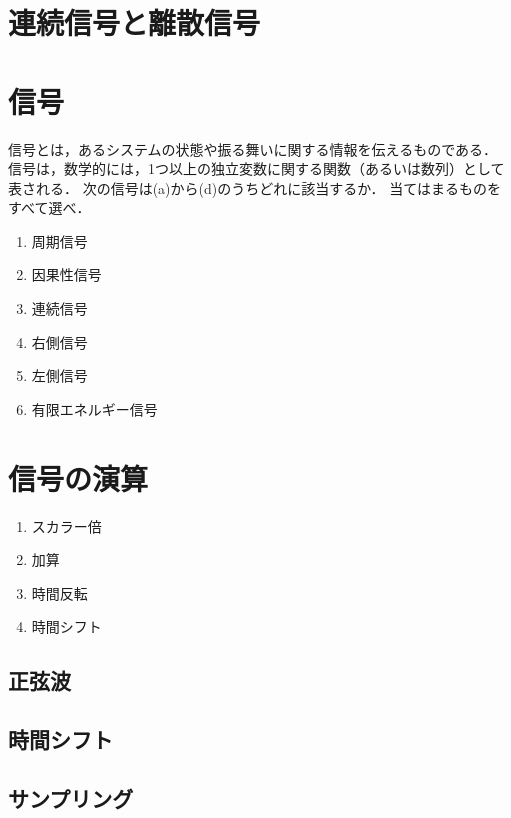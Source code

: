 \section{連続信号と離散信号}

\section{信号}
  信号とは，あるシステムの状態や振る舞いに関する情報を伝えるものである．
  信号は，数学的には，1つ以上の独立変数に関する関数（あるいは数列）として表される．
  次の信号は(a)から(d)のうちどれに該当するか．
  当てはまるものをすべて選べ．
  \begin{enumerate}[label=(\roman*)]
    \item 周期信号
    \item 因果性信号
    \item 連続信号
    \item 右側信号
    \item 左側信号
    \item 有限エネルギー信号
  \end{enumerate}

\section{信号の演算}
  \begin{enumerate}[label=(\roman*)]
    \item スカラー倍
    \item 加算
    \item 時間反転
    \item 時間シフト
  \end{enumerate}

\subsection{正弦波}

\subsection{時間シフト}

\subsection{サンプリング}
